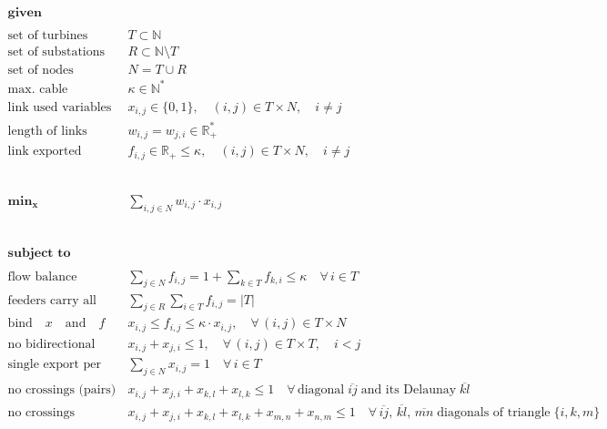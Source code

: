 \documentclass[crop,border=2pt]{standalone}
\begin{document}
\fontsize{14pt}{20pt}\selectfont
\(
\displaystyle
\begin{aligned}
\textbf{given} \quad &\\
\\
	\textrm{set of turbines} \quad & T \subset \mathbb{N}\\
	\textrm{set of substations} \quad & R \subset \mathbb{N} \setminus T\\
\textrm{set of nodes} \quad & N = T \cup R\\
	\textrm{max. cable capacity} \quad & \kappa \in \mathbb{N}^\ast\\
\textrm{link used variables} \quad & x_{i, j} \in \{0, 1\}, \quad (i, j) \in T \times N, \quad i \neq j\\
\textrm{length of links} \quad & w_{i, j} = w_{j, i} \in \mathbb{R}^\ast_+\\
\textrm{link exported power} \quad & f_{i, j} \in \mathbb{R}_+ \leq \kappa, \quad (i, j) \in T \times N, \quad i \neq j\\
	& \phantom{X}\\
	& \phantom{X}\\
	\mathbf{\min_{x}} \quad & \sum_{i, j \in N} w_{i, j} \cdot x_{i, j}\\
	& \phantom{X}\\
	& \phantom{X}\\
\textbf{subject to} \quad &\\
\\
	\textrm{flow balance} \quad & \sum_{j \in N} f_{i, j} = 1 + \sum_{k \in T} f_{k, i} \leq \kappa \quad \forall \, i \in T\\
	\textrm{feeders carry all power} \quad & \sum_{j \in R} \sum_{i \in T} f_{i, j} = |T|\\
	\textrm{bind}\quad x \quad \textrm{and} \quad f \quad & x_{i, j} \leq f_{i, j} \leq \kappa \cdot x_{i, j}, \quad \forall \, (i, j) \in T \times N\\
	\textrm{no bidirectional links} \quad & x_{i, j} + x_{j, i} \leq 1, \quad \forall \, (i, j) \in T \times T, \quad i < j\\
	\textrm{single export per turbine} \quad & \sum_{j \in N} x_{i, j} = 1 \quad \forall \, i \in T\\
	\textrm{no crossings (pairs)} \quad & x_{i, j} + x_{j, i} + x_{k, l} + x_{l, k} \leq 1 \quad \forall \, \text{diagonal} \; \overline{ij} \; \text{and its Delaunay}  \; \overline{kl}\\
	\textrm{no crossings (triplets)} \quad & x_{i, j} + x_{j, i} + x_{k, l} + x_{l, k} + x_{m, n} + x_{n, m} \leq 1 \quad \forall \, \overline{ij},\,\overline{kl},\,\overline{mn} \; \text{diagonals of triangle}\; \{i,k, m\}
\end{aligned}
\)
\end{document}
